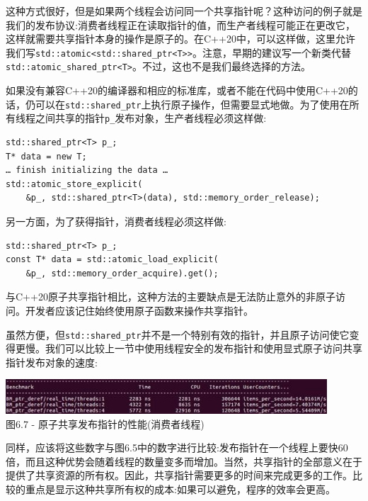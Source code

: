 这种方式很好，但是如果两个线程会访问同一个共享指针呢？这种访问的例子就是我们的发布协议:消费者线程正在读取指针的值，而生产者线程可能正在更改它，这样就需要共享指针本身的操作是原子的。在C++20中，可以这样做，这里允许我们写\texttt{std::atomic<std::shared\_ptr<T>>}。注意，早期的建议写一个新类代替\texttt{std::atomic\_shared\_ptr<T>}。不过，这也不是我们最终选择的方法。

如果没有兼容C++20的编译器和相应的标准库，或者不能在代码中使用C++20的话，仍可以在\texttt{std::shared\_ptr}上执行原子操作，但需要显式地做。为了使用在所有线程之间共享的指针\texttt{p\_}发布对象，生产者线程必须这样做:

\begin{lstlisting}[style=styleCXX]
std::shared_ptr<T> p_;
T* data = new T;
… finish initializing the data …
std::atomic_store_explicit(
	&p_, std::shared_ptr<T>(data), std::memory_order_release);
\end{lstlisting}

另一方面，为了获得指针，消费者线程必须这样做:

\begin{lstlisting}[style=styleCXX]
std::shared_ptr<T> p_;
const T* data = std::atomic_load_explicit(
	&p_, std::memory_order_acquire).get();
\end{lstlisting}

与C++20原子共享指针相比，这种方法的主要缺点是无法防止意外的非原子访问。开发者应该记住始终使用原子函数来操作共享指针。

虽然方便，但\texttt{std::shared\_ptr}并不是一个特别有效的指针，并且原子访问使它变得更慢。我们可以比较上一节中使用线程安全的发布指针和使用显式原子访问共享指针发布对象的速度:

\begin{center}
\includegraphics[width=0.9\textwidth]{content/2/chapter6/images/7.jpg}\\
图6.7 - 原子共享发布指针的性能(消费者线程)
\end{center}

同样，应该将这些数字与图6.5中的数字进行比较:发布指针在一个线程上要快60倍，而且这种优势会随着线程的数量变多而增加。当然，共享指针的全部意义在于提供了共享资源的所有权。因此，共享指针需要更多的时间来完成更多的工作。比较的重点是显示这种共享所有权的成本:如果可以避免，程序的效率会更高。

